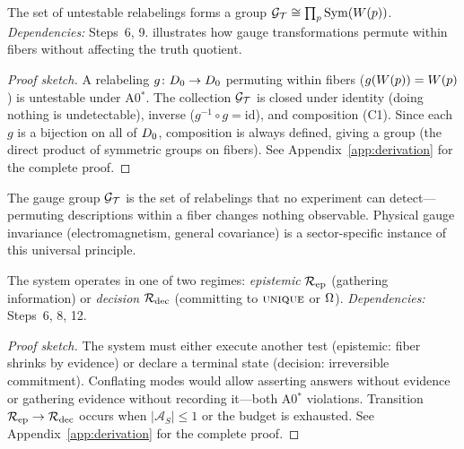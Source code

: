 \begin{theorem}
\label{thm:gauge}
The set of untestable relabelings forms a group $\mathcal{G}_{\mathcal{T}} \cong \prod_p \mathrm{Sym}(W(p))$.
\emph{Dependencies:} Steps~6, 9.
 illustrates how gauge transformations permute within fibers without affecting the truth quotient.
\begin{proof}[Proof sketch]
A relabeling $g \colon D_0 \to D_0$ permuting within fibers ($g(W(p)) = W(p)$) is untestable under A0$^*$.  The collection $\mathcal{G}_{\mathcal{T}}$ is closed under identity (doing nothing is undetectable), inverse ($g^{-1} \circ g = \mathrm{id}$), and composition (C1).  Since each $g$ is a bijection on all of $D_0$, composition is always defined, giving a group (the direct product of symmetric groups on fibers).
See Appendix~\ref{app:derivation} for the complete proof.
\end{proof}
\end{theorem}

\begin{remark}
\label{rem:gauge-intuition}
The gauge group $\mathcal{G}_{\mathcal{T}}$ is the set of relabelings that no experiment can
detect---permuting descriptions within a fiber changes nothing observable.
Physical gauge invariance (electromagnetism, general covariance) is a
sector-specific instance of this universal principle.
\end{remark}

\begin{theorem}
\label{thm:regimes}
The system operates in one of two regimes: \emph{epistemic} $\mathcal{R}_{\mathrm{ep}}$ (gathering information) or \emph{decision} $\mathcal{R}_{\mathrm{dec}}$ (committing to $\textsc{unique}$ or $\Omega$).
\emph{Dependencies:} Steps~6, 8, 12.
\begin{proof}[Proof sketch]
The system must either execute another test (epistemic: fiber shrinks by evidence) or declare a terminal state (decision: irreversible commitment).  Conflating modes would allow asserting answers without evidence or gathering evidence without recording it---both A0$^*$ violations.  Transition $\mathcal{R}_{\mathrm{ep}} \to \mathcal{R}_{\mathrm{dec}}$ occurs when $|\mathcal{A}_S| \leq 1$ or the budget is exhausted.
See Appendix~\ref{app:derivation} for the complete proof.
\end{proof}
\end{theorem}

